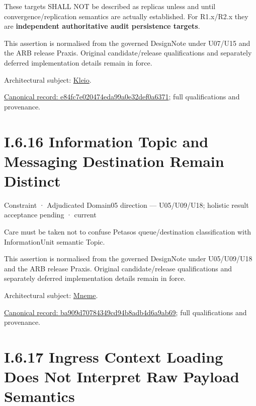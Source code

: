 These targets SHALL NOT be described as replicas unless and until convergence/replication semantics are actually established. For R1.x/R2.x they are \textbf{independent authoritative audit persistence targets}.



This assertion is normalised from the governed DesignNote under U07/U15 and the ARB release Praxis. Original candidate/release qualifications and separately deferred implementation details remain in force.



Architectural subject: \hyperref[element:fefda110e2274884ad58906733606efd]{Kleio}.


{\footnotesize \href{../../../../../../../../continuum/motivation/constraint/e84fc7e020474eda99a0e32def0a6371.md}{Canonical record: e84fc7e020474eda99a0e32def0a6371}; full qualifications and provenance.}\par
\section*{I.6.16 Information Topic and Messaging Destination Remain Distinct}
\label{navigation:I.6.16}

\label{element:ba909d70784349cd94b8adb4d6a9ab69}
{\small Constraint · Adjudicated Domain05 direction — U05/U09/U18; holistic result acceptance pending · current}\par

Care must be taken not to confuse Petasos queue/destination classification with InformationUnit semantic Topic.



This assertion is normalised from the governed DesignNote under U05/U09/U18 and the ARB release Praxis. Original candidate/release qualifications and separately deferred implementation details remain in force.



Architectural subject: \hyperref[element:1af8a56358f7429fabfb57be66542a99]{Mneme}.


{\footnotesize \href{../../../../../../../../continuum/motivation/constraint/ba909d70784349cd94b8adb4d6a9ab69.md}{Canonical record: ba909d70784349cd94b8adb4d6a9ab69}; full qualifications and provenance.}\par
\section*{I.6.17 Ingress Context Loading Does Not Interpret Raw Payload Semantics}
\label{navigation:I.6.17}

